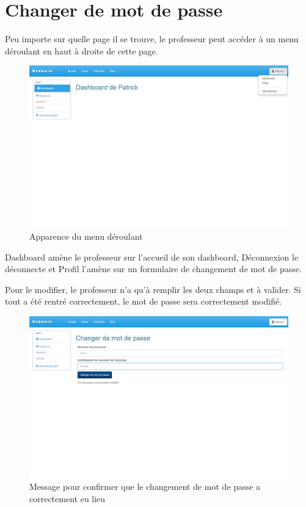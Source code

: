 \documentclass[letterpaper,10pt,french]{sphinxmanual}
\begin{document}
\section{Changer de mot de passe}
\label{dashboard:changer-de-mot-de-passe}
Peu importe sur quelle page il se trouve, le professeur peut accéder à un menu
déroulant en haut à droite de cette page.
\begin{figure}[htbp]
\centering
\capstart

\includegraphics[width=0.700\linewidth]{menuDeroulant.jpg}
\caption{Apparence du menu déroulant}\end{figure}

Dashboard amène le professeur sur l'accueil de son dashboard, Déconnexion le
déconnecte et Profil l'amène sur un formulaire de changement de mot de passe.

Pour le modifier, le professeur n'a qu'à remplir les deux champs et à valider.
Si tout a été rentré correctement, le mot de passe sera correctement modifié.
\begin{figure}[htbp]
\centering
\capstart

\includegraphics[width=0.700\linewidth]{passwordSuccess.jpg}
\caption{Message pour confirmer que le changement de mot de passe a correctement eu
lieu}\end{figure}
\end{document}
